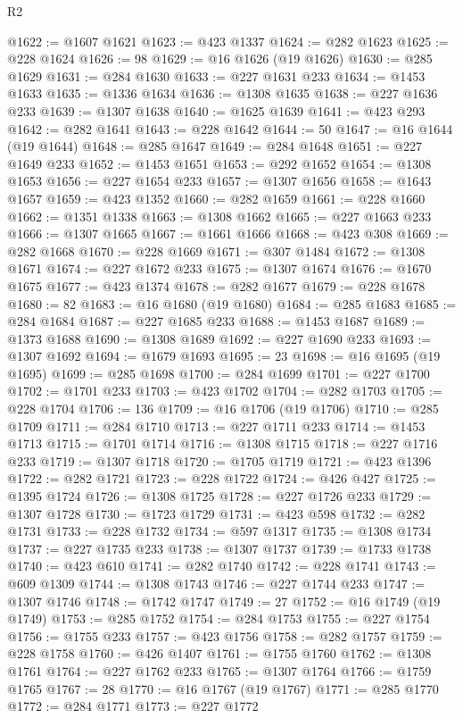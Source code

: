 \begin{lexlean}{R2}
\begin{coremodule}
@1622 := @1607 @1621
@1623 := @423 @1337
@1624 := @282 @1623
@1625 := @228 @1624
@1626 := 98
@1629 := @16 @1626 (@19 @1626)
@1630 := @285 @1629
@1631 := @284 @1630
@1633 := @227 @1631 @233
@1634 := @1453 @1633
@1635 := @1336 @1634
@1636 := @1308 @1635
@1638 := @227 @1636 @233
@1639 := @1307 @1638
@1640 := @1625 @1639
@1641 := @423 @293
@1642 := @282 @1641
@1643 := @228 @1642
@1644 := 50
@1647 := @16 @1644 (@19 @1644)
@1648 := @285 @1647
@1649 := @284 @1648
@1651 := @227 @1649 @233
@1652 := @1453 @1651
@1653 := @292 @1652
@1654 := @1308 @1653
@1656 := @227 @1654 @233
@1657 := @1307 @1656
@1658 := @1643 @1657
@1659 := @423 @1352
@1660 := @282 @1659
@1661 := @228 @1660
@1662 := @1351 @1338
@1663 := @1308 @1662
@1665 := @227 @1663 @233
@1666 := @1307 @1665
@1667 := @1661 @1666
@1668 := @423 @308
@1669 := @282 @1668
@1670 := @228 @1669
@1671 := @307 @1484
@1672 := @1308 @1671
@1674 := @227 @1672 @233
@1675 := @1307 @1674
@1676 := @1670 @1675
@1677 := @423 @1374
@1678 := @282 @1677
@1679 := @228 @1678
@1680 := 82
@1683 := @16 @1680 (@19 @1680)
@1684 := @285 @1683
@1685 := @284 @1684
@1687 := @227 @1685 @233
@1688 := @1453 @1687
@1689 := @1373 @1688
@1690 := @1308 @1689
@1692 := @227 @1690 @233
@1693 := @1307 @1692
@1694 := @1679 @1693
@1695 := 23
@1698 := @16 @1695 (@19 @1695)
@1699 := @285 @1698
@1700 := @284 @1699
@1701 := @227 @1700
@1702 := @1701 @233
@1703 := @423 @1702
@1704 := @282 @1703
@1705 := @228 @1704
@1706 := 136
@1709 := @16 @1706 (@19 @1706)
@1710 := @285 @1709
@1711 := @284 @1710
@1713 := @227 @1711 @233
@1714 := @1453 @1713
@1715 := @1701 @1714
@1716 := @1308 @1715
@1718 := @227 @1716 @233
@1719 := @1307 @1718
@1720 := @1705 @1719
@1721 := @423 @1396
@1722 := @282 @1721
@1723 := @228 @1722
@1724 := @426 @427
@1725 := @1395 @1724
@1726 := @1308 @1725
@1728 := @227 @1726 @233
@1729 := @1307 @1728
@1730 := @1723 @1729
@1731 := @423 @598
@1732 := @282 @1731
@1733 := @228 @1732
@1734 := @597 @1317
@1735 := @1308 @1734
@1737 := @227 @1735 @233
@1738 := @1307 @1737
@1739 := @1733 @1738
@1740 := @423 @610
@1741 := @282 @1740
@1742 := @228 @1741
@1743 := @609 @1309
@1744 := @1308 @1743
@1746 := @227 @1744 @233
@1747 := @1307 @1746
@1748 := @1742 @1747
@1749 := 27
@1752 := @16 @1749 (@19 @1749)
@1753 := @285 @1752
@1754 := @284 @1753
@1755 := @227 @1754
@1756 := @1755 @233
@1757 := @423 @1756
@1758 := @282 @1757
@1759 := @228 @1758
@1760 := @426 @1407
@1761 := @1755 @1760
@1762 := @1308 @1761
@1764 := @227 @1762 @233
@1765 := @1307 @1764
@1766 := @1759 @1765
@1767 := 28
@1770 := @16 @1767 (@19 @1767)
@1771 := @285 @1770
@1772 := @284 @1771
@1773 := @227 @1772

\end{coremodule}
\end{lexlean}
